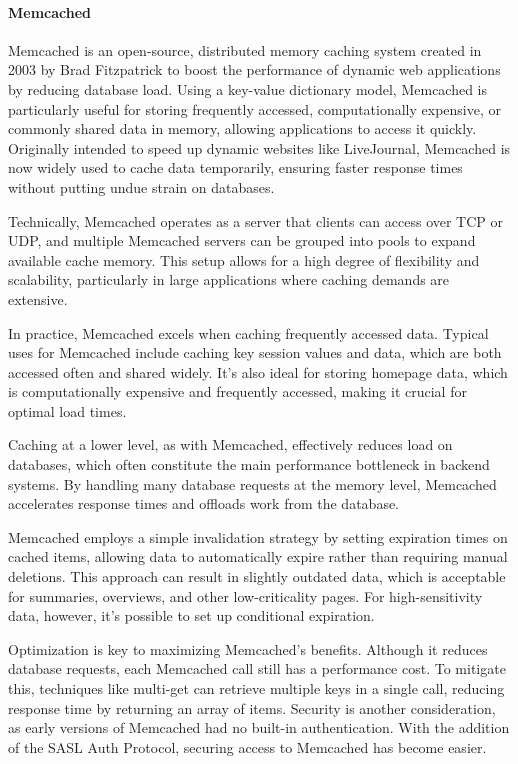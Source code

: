 \paragraph*{Memcached}
Memcached is an open-source, distributed memory caching system created in 2003 by Brad Fitzpatrick to boost the performance of dynamic web applications by reducing database load. 
Using a key-value dictionary model, Memcached is particularly useful for storing frequently accessed, computationally expensive, or commonly shared data in memory, allowing applications to access it quickly. 
Originally intended to speed up dynamic websites like LiveJournal, Memcached is now widely used to cache data temporarily, ensuring faster response times without putting undue strain on databases.

Technically, Memcached operates as a server that clients can access over TCP or UDP, and multiple Memcached servers can be grouped into pools to expand available cache memory. 
This setup allows for a high degree of flexibility and scalability, particularly in large applications where caching demands are extensive.

In practice, Memcached excels when caching frequently accessed data. 
Typical uses for Memcached include caching key session values and data, which are both accessed often and shared widely.
It's also ideal for storing homepage data, which is computationally expensive and frequently accessed, making it crucial for optimal load times.

Caching at a lower level, as with Memcached, effectively reduces load on databases, which often constitute the main performance bottleneck in backend systems. 
By handling many database requests at the memory level, Memcached accelerates response times and offloads work from the database.

Memcached employs a simple invalidation strategy by setting expiration times on cached items, allowing data to automatically expire rather than requiring manual deletions. 
This approach can result in slightly outdated data, which is acceptable for summaries, overviews, and other low-criticality pages. 
For high-sensitivity data, however, it's possible to set up conditional expiration.

Optimization is key to maximizing Memcached's benefits. 
Although it reduces database requests, each Memcached call still has a performance cost.
To mitigate this, techniques like multi-get can retrieve multiple keys in a single call, reducing response time by returning an array of items. 
Security is another consideration, as early versions of Memcached had no built-in authentication. With the addition of the SASL Auth Protocol, securing access to Memcached has become easier.
